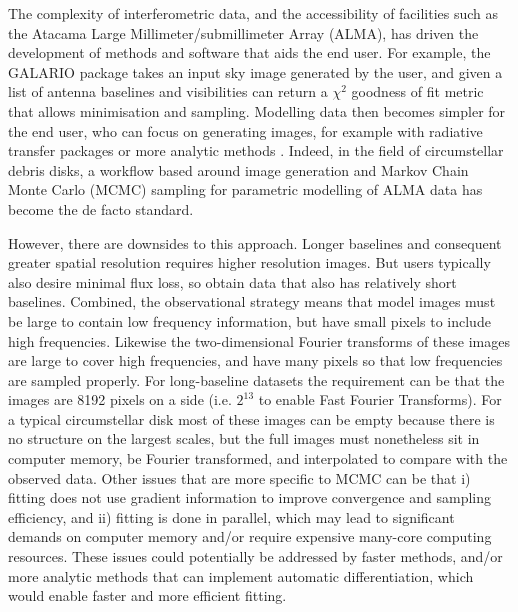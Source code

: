 \documentclass[fleqn,usenatbib]{mnras}
\begin{document}
The complexity of interferometric data, and the accessibility of facilities such as the Atacama Large Millimeter/submillimeter Array (ALMA), has driven the development of methods and software that aids the end user. For example, the \textsc{GALARIO} package \citep{2018MNRAS.476.4527T} takes an input sky image generated by the user, and given a list of antenna baselines and visibilities can return a $\chi^2$ goodness of fit metric that allows minimisation and sampling. Modelling data then becomes simpler for the end user, who can focus on generating images, for example with radiative transfer packages \citep[e.g. RADMC,][]{2012ascl.soft02015D} or more analytic methods \citep[e.g.][]{2021MNRAS.504.4497C}. Indeed, in the field of circumstellar debris disks, a workflow based around image generation and Markov Chain Monte Carlo (MCMC) sampling for parametric modelling of ALMA data has become the de facto standard.

However, there are downsides to this approach. Longer  baselines and consequent greater spatial resolution requires higher resolution images. But users typically also desire minimal flux loss, so obtain data that also has relatively short baselines.  Combined, the observational strategy means that model images must be large to contain low frequency information, but have small pixels to include high frequencies. Likewise the two-dimensional Fourier transforms of these images are large to cover high frequencies, and have many pixels so that low frequencies are sampled properly. For long-baseline datasets the requirement can be that the images are 8192 pixels on a side (i.e. $2^{13}$ to enable Fast Fourier Transforms). For a typical circumstellar disk most of these images can be empty because there is no structure on the largest scales, but the full images must nonetheless sit in computer memory, be Fourier transformed, and interpolated to compare with the observed data. Other issues that are more specific to MCMC can be that i) fitting does not use gradient information to improve convergence and sampling efficiency, and ii) fitting is done in parallel, which may lead to significant demands on computer memory and/or require expensive many-core computing resources. These issues could potentially be addressed by faster methods, and/or more analytic methods that can implement automatic differentiation, which would enable faster and more efficient fitting.
\end{document}
